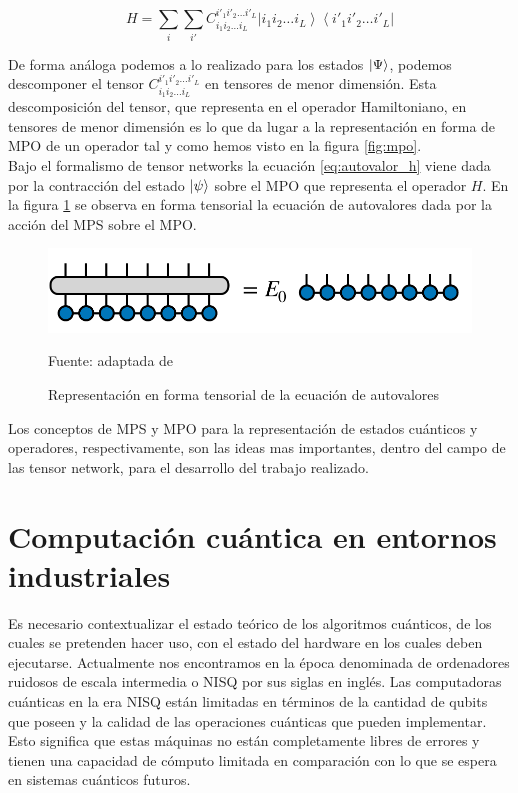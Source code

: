 \begin{equation}
    H = \sum_{i} \sum_{i'} C_{i_1 i_2 \ldots i_L}^{i'_1 i'_2 \ldots i'_L} \left| i_1 i_2 \ldots i_L \right\rangle \left\langle i'_1 i'_2 \ldots i'_L \right|
    \label{eq:operator}
\end{equation}

De forma análoga podemos a lo realizado para los estados $\ket{\Psi}$, podemos descomponer el tensor $ C_{i_1 i_2 \ldots i_L}^{i'_1 i'_2 \ldots i'_L}$ en tensores de menor dimensión. Esta descomposición del tensor, que representa en el operador Hamiltoniano, en tensores de menor dimensión es lo que da lugar a la representación en forma de MPO de un operador tal y como hemos visto en la figura \ref{fig:mpo}. \\


Bajo el formalismo de tensor networks la ecuación \ref{eq:autovalor_h} viene dada por la contracción del estado $\ket{\psi}$ sobre el MPO que representa el operador $H$. En la figura \ref{fig:mpo_to_mps} se observa en forma tensorial la ecuación de autovalores dada por la acción del MPS sobre el MPO.

\newpage

\begin{figure}[!ht]
    \centering
    \includegraphics[scale = 0.65]{img/03-mpo_to_mps.png}
    \caption{Representación en forma tensorial de la ecuación de autovalores}
    Fuente: adaptada de \citep{tn} 
    \label{fig:mpo_to_mps}
\end{figure}

Los conceptos de MPS y MPO para la representación de estados cuánticos y operadores, respectivamente, son las ideas mas importantes, dentro del campo de las tensor network, para el desarrollo del trabajo realizado. 


\section{Computación cuántica en entornos industriales}

Es necesario contextualizar el estado teórico de los algoritmos cuánticos, de los cuales se pretenden hacer uso, con el estado del hardware en los cuales deben ejecutarse. Actualmente nos encontramos en la época denominada de ordenadores ruidosos de escala intermedia o NISQ por sus siglas en inglés. Las computadoras cuánticas en la era NISQ están limitadas en términos de la cantidad de qubits que poseen y la calidad de las operaciones cuánticas que pueden implementar. Esto significa que estas máquinas no están completamente libres de errores y tienen una capacidad de cómputo limitada en comparación con lo que se espera en sistemas cuánticos futuros. \\


